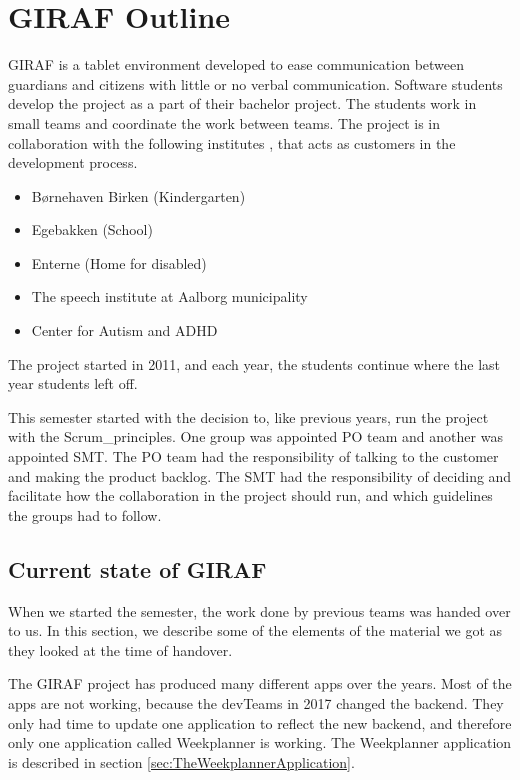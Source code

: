 \chapter{GIRAF Outline}

GIRAF is a tablet environment developed to ease communication between \glspl{guardian} and \glspl{citizen} with little or no verbal communication. Software students develop the project as a part of their bachelor project. The students work in small teams and coordinate the work between teams. The project is in collaboration with the following institutes \cite{GirafWebsite}, that acts as customers in the development process.

\begin{itemize}
    \item Børnehaven Birken (Kindergarten) \cite{bhBirken}
    \item Egebakken (School) \cite{egebakken}
    \item Enterne (Home for disabled) \cite{enterne}
    \item The speech institute at Aalborg municipality
    \item Center for Autism and ADHD \cite{center_for_autism}
\end{itemize}

The project started in 2011, and each year, the students continue where the last year students left off.

This semester started with the decision to, like previous years, run the project with the \gls{Scrum_principles}. One group was appointed \gls{PO} team and another was appointed \gls{SMT}. The \gls{PO} team had the responsibility of talking to the customer and making the product backlog. The \gls{SMT} had the responsibility of deciding and facilitate how the collaboration in the project should run, and which guidelines the groups had to follow.

\section{Current state of GIRAF}

When we started the semester, the work done by previous teams was handed over to us. In this section, we describe some of the elements of the material we got as they looked at the time of handover.

The GIRAF project has produced many different apps over the years. Most of the apps are not working, because the \glspl{devTeam} in 2017 changed the backend. They only had time to update one application to reflect the new backend, and therefore only one application called Weekplanner is working. The Weekplanner application is described in section \ref{sec:TheWeekplannerApplication}.

